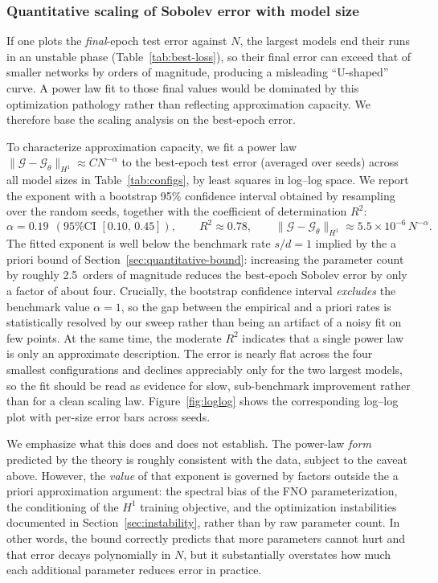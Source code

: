 \documentclass[11pt]{article}
\newcommand{\sweepdecades}{2.5}
\newcommand{\alphaval}{0.19}
\newcommand{\alphaCI}{[0.10,\, 0.45]}
\newcommand{\rsq}{0.78}
\newcommand{\Cval}{5.5\times 10^{-6}}
\theoremstyle{plain}
\theoremstyle{definition}
\theoremstyle{remark}
\begin{document}
\subsubsection{Quantitative scaling of Sobolev error with model size}
\label{sec:scaling}
If one plots the \emph{final}-epoch test error against $N$, the largest models
end their runs in an unstable phase (Table~\ref{tab:best-loss}), so their final
error can exceed that of smaller networks by orders of magnitude, producing a
misleading ``U-shaped'' curve. A power law fit to those final values would be
dominated by this optimization pathology rather than reflecting approximation
capacity. We therefore base the scaling analysis on the best-epoch error.

To characterize approximation capacity, we fit a power law
$\|\mathcal{G}-\mathcal{G}_\theta\|_{H^1} \approx C N^{-\alpha}$ to the
best-epoch test error (averaged over seeds) across all model sizes in
Table~\ref{tab:configs}, by least squares in log--log space. We report the
exponent with a bootstrap 95\% confidence interval obtained by resampling over
the random seeds, together with the coefficient of determination $R^2$:
\[
\alpha = \alphaval \ \ (\text{95\% CI } \alphaCI), \qquad
R^2 \approx \rsq, \qquad
\|\mathcal{G} - \mathcal{G}_\theta\|_{H^1} \approx \Cval \, N^{-\alpha}.
\]
The fitted exponent is well below the benchmark rate $s/d = 1$ implied by the
a priori bound of Section~\ref{sec:quantitative-bound}: increasing the
parameter count by roughly \sweepdecades\ orders of magnitude reduces the
best-epoch Sobolev error by only a factor of about four. Crucially, the
bootstrap confidence interval \emph{excludes} the benchmark value $\alpha = 1$,
so the gap between the empirical and a priori rates is statistically resolved
by our sweep rather than being an artifact of a noisy fit on few points. At the
same time, the moderate $R^2$ indicates that a single power law is only an
approximate description. The error is nearly flat across the four smallest
configurations and declines appreciably only for the two largest models, so the
fit should be read as evidence for slow, sub-benchmark improvement rather than
for a clean scaling law. Figure~\ref{fig:loglog} shows the corresponding
log--log plot with per-size error bars across seeds.

We emphasize what this does and does not establish. The power-law \emph{form} predicted by the theory is roughly consistent with the data, subject to the caveat above. However, the \emph{value} of that exponent is governed by factors outside the a priori approximation
argument: the spectral bias of the FNO parameterization, the conditioning of
the $H^1$ training objective, and the optimization instabilities documented in
Section~\ref{sec:instability}, rather than by raw parameter count. In other
words, the bound correctly predicts that more parameters cannot hurt and that
error decays polynomially in $N$, but it substantially overstates how much each
additional parameter reduces error in practice.
\end{document}
